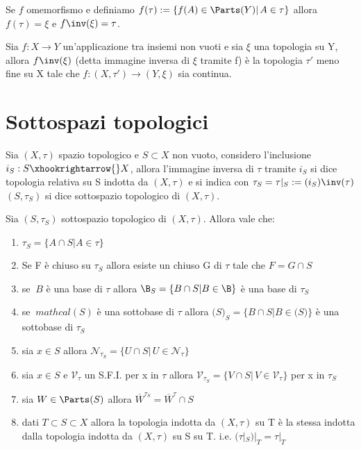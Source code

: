 \documentclass[a4paper]{article}
\begin{document}
\begin{oss}
Se $f$ omemorfismo e definiamo $f(\tau) := \{ f(A) \in \Parts (Y) | \, A \in \tau \}$ allora $f(\tau ) = \xi$ e $f\inv (\xi ) = \tau $.
\end{oss}

\begin{prop} Sia $f:X \to Y $ un'applicazione tra insiemi non vuoti e sia $\xi $ una topologia su Y, allora $f\inv ( \xi) $ (detta immagine inversa di $\xi$ tramite f) è la topologia $\tau '$ meno fine su X tale che $f:(X,\tau') \to (Y,\xi )$ sia continua.
\end{prop}

\section{Sottospazi topologici}

\begin{deff} Sia $(X,\tau)$ spazio topologico e $S \subset X $ non vuoto, considero l'inclusione $i_S : S \xhookrightarrow{} X$, allora l'immagine inversa di $\tau $ tramite $i_S $ si dice topologia relativa su S indotta da $(X,\tau)$ e si indica con $\tau_S = \tau |_S := (i_S)\inv (\tau ) $ 
$(S,\tau_S) $ si dice sottospazio topologico di $(X,\tau)$.
\end{deff}

\begin{prop} 
Sia $(S,\tau_S) $ sottospazio topologico di $(X,\tau)$. Allora vale che:
\begin{enumerate}
	\item $\tau_S = \{ A\cap S | A \in \tau \}$
	\item Se F è chiuso su $\tau_S$ allora esiste un chiuso G di $\tau $ tale che $F=G\cap S $
	\item se $\	B $ è una base di $\tau $ allora $\B _S = \{B \cap S | B \in \B \} $ è una base di $\tau _S $ 
	\item se $\	mathcal(S) $ è una sottobase di $\tau $ allora $\mathcal(S) _S = \{B \cap S | B \in \mathcal(S) \} $ è una sottobase di $\tau _S $ 
	\item sia $x \in S$ allora $\mathcal{N}_{\tau_S} = \{ U \cap S | \, U \in \mathcal{N}_{\tau} \}$
	\item sia $x \in S$ e $\mathcal{V}_{\tau}$ un S.F.I. per x in $\tau$ allora $\mathcal{V}_{\tau_S} = \{ V \cap S | \, V \in \mathcal{V}_{\tau} \}$ per x in $\tau_S$
	\item sia $W \in \Parts (S) $ allora $\overline{W}^{\tau_S} =  \overline{W}^\tau \cap S$
	\item dati $T \subset S \subset X$ allora la topologia indotta da $(X,\tau)$ su T è la stessa indotta dalla topologia indotta da  $(X,\tau)$ su S su T. i.e. $(\tau |_S )|_T  =\tau |_T $
\end{enumerate}
\end{prop}
\end{document}
